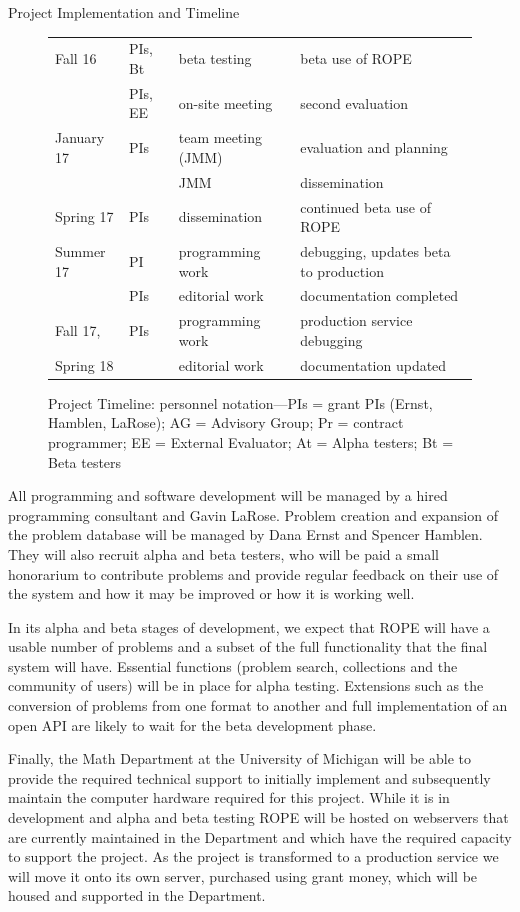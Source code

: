 \documentclass[11pt]{article}
\begin{document}
\begin{section}{Project Implementation and Timeline}
\begin{figure}
\begin{center}
\begin{tabular}{|l|l|l|l|}
  \hline
  Fall 16 & PIs, Bt & beta testing & beta use of ROPE \\
	& PIs, EE & on-site meeting & second evaluation \\
  \hline
  January 17 & PIs & team meeting (JMM) & evaluation and planning \\
        & & JMM & dissemination \\
  \hline
  Spring 17 & PIs & dissemination & continued beta use of ROPE \\
  \hline
  Summer 17 & PI & programming work & debugging, updates beta to
	production \\ 
	& PIs & editorial work & documentation completed \\
  \hline
  Fall 17, & PIs & programming work & production service debugging\\
  Spring 18 & & editorial work & documentation updated \\ 
  \hline
\end{tabular}
\caption{Project Timeline: personnel notation---PIs = grant PIs (Ernst,
  Hamblen, LaRose); AG = Advisory Group; Pr = contract programmer; EE =
  External Evaluator; At = Alpha testers; Bt = Beta testers}
\label{timeline}
\end{center}
\end{figure}

All programming and software development will be managed by a hired
programming consultant and Gavin LaRose.  Problem creation and expansion
of the problem database will be managed by Dana Ernst and Spencer
Hamblen.  They will also recruit alpha and beta testers, who will be paid
a small honorarium to contribute problems and provide regular feedback on
their use of the system and how it may be improved or how it is working
well.

In its alpha and beta stages of development, we expect that ROPE will have
a usable number of problems and a subset of the full functionality that
the final system will have.  Essential functions (problem search,
collections and the community of users) will be in place for alpha
testing.  Extensions such as the conversion of problems from one format to
another and full implementation of an
open API are likely to wait for the beta development phase.

Finally, the Math Department at the University of Michigan will be able to
provide the required technical support to initially implement and
subsequently maintain the computer hardware required for this project.
While it is in development and alpha and beta testing ROPE will be
hosted on webservers that are currently maintained in the Department and
which have the required capacity to support the project.  As the
project is transformed to a production service we will move it onto its
own server, purchased using grant money, which will be housed and
supported in the Department.

\end{section}
\end{document}
